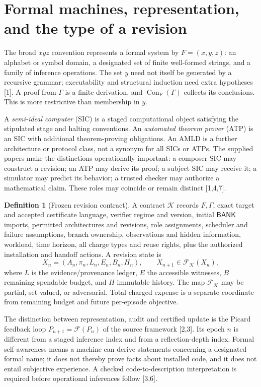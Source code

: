 \documentclass[11pt,letterpaper]{article}
\theoremstyle{definition}
\newtheorem{definition}[theorem]{Definition}
\theoremstyle{remark}
\newcommand{\K}{\mathcal K}
\newcommand{\F}{\mathcal F}
\newcommand{\Bank}{\mathsf{BANK}}
\newcommand{\src}[1]{\textup{[#1]}}
\begin{document}
\section{Formal machines, representation, and the type of a revision}
The broad $xyz$ convention represents a formal system by $F=(x,y,z)$: an alphabet or symbol domain, a designated set of finite well-formed strings, and a family of inference operations. The set $y$ need not itself be generated by a recursive grammar; executability and structural induction need extra hypotheses \src{1}. A proof from $\Gamma$ is a finite derivation, and $\operatorname{Con}_F(\Gamma)$ collects its conclusions. This is more restrictive than membership in $y$.

A \emph{semi-ideal computer} (SIC) is a staged computational object satisfying the stipulated stage and halting conventions. An \emph{automated theorem prover} (ATP) is an SIC with additional theorem-proving obligations. An AMLD is a further architecture or protocol class, not a synonym for all SICs or ATPs. The supplied papers make the distinctions operationally important: a composer SIC may construct a revision; an ATP may derive its proof; a subject SIC may receive it; a simulator may predict its behavior; a trusted checker may authorize a mathematical claim. These roles may coincide or remain distinct \src{1,4,7}.

\begin{definition}[Frozen revision contract]\label{def:contract}
A contract $\K$ records $F,\Gamma$, exact target and accepted certificate language, verifier regime and version, initial $\Bank$ imports, permitted architectures and revisions, role assignments, scheduler and failure assumptions, branch ownership, observations and hidden information, workload, time horizon, all charge types and reuse rights, plus the authorized installation and handoff actions. A revision state is
\[
 X_n=(A_n,\pi_n,L_n,E_n,B_n,H_n),\qquad X_{n+1}\in\F_{\K}(X_n),
\]
where $L$ is the evidence/provenance ledger, $E$ the accessible witnesses, $B$ remaining spendable budget, and $H$ immutable history. The map $\F_{\K}$ may be partial, set-valued, or adversarial. Total charged expense is a separate coordinate from remaining budget and future per-episode objective.
\end{definition}

The distinction between representation, audit and certified update is the Picard feedback loop $P_{n+1}=\F(P_n)$ of the source framework \src{2,3}. Its epoch $n$ is different from a staged inference index and from a reflection-depth index. Formal self-awareness means a machine can derive statements concerning a designated formal name; it does not thereby prove facts about installed code, and it does not entail subjective experience. A checked code-to-description interpretation is required before operational inferences follow \src{3,6}.
\end{document}
